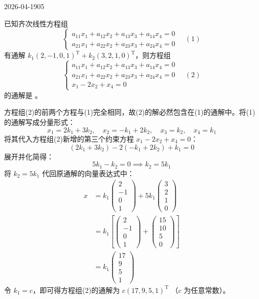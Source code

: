 \begin{mistake}{2026-04-19}{05}

\begin{problemcontent}
已知齐次线性方程组
\[
\begin{cases}
a_{11}x_1 + a_{12}x_2 + a_{13}x_3 + a_{14}x_4 = 0 \\
a_{21}x_1 + a_{22}x_2 + a_{23}x_3 + a_{24}x_4 = 0
\end{cases} \quad (1)
\]
有通解 \( k_1(2, -1, 0, 1)^{\mathrm{T}} + k_2(3, 2, 1, 0)^{\mathrm{T}} \)，则方程组
\[
\begin{cases}
a_{11}x_1 + a_{12}x_2 + a_{13}x_3 + a_{14}x_4 = 0 \\
a_{21}x_1 + a_{22}x_2 + a_{23}x_3 + a_{24}x_4 = 0 \\
x_1 - 2x_2 + x_4 = 0
\end{cases} \quad (2)
\]
的通解是 \underline{\hspace{3cm}}。
\end{problemcontent}

\begin{solutioncontent}
方程组(2)的前两个方程与(1)完全相同，故(2)的解必然包含在(1)的通解中。将(1)的通解写成分量形式：
\[
x_1 = 2k_1 + 3k_2, \quad x_2 = -k_1 + 2k_2, \quad x_3 = k_2, \quad x_4 = k_1
\]
将其代入方程组(2)新增的第三个约束方程 \( x_1 - 2x_2 + x_4 = 0 \)：
\[
(2k_1 + 3k_2) - 2(-k_1 + 2k_2) + k_1 = 0
\]
展开并化简得：
\[
5k_1 - k_2 = 0 \implies k_2 = 5k_1
\]
将 \( k_2 = 5k_1 \) 代回原通解的向量表达式中：
\[
\begin{aligned}
x &= k_1 \begin{pmatrix} 2 \\ -1 \\ 0 \\ 1 \end{pmatrix} + 5k_1 \begin{pmatrix} 3 \\ 2 \\ 1 \\ 0 \end{pmatrix} \\
 &= k_1 \left[ \begin{pmatrix} 2 \\ -1 \\ 0 \\ 1 \end{pmatrix} + \begin{pmatrix} 15 \\ 10 \\ 5 \\ 0 \end{pmatrix} \right] \\
 &= k_1 \begin{pmatrix} 17 \\ 9 \\ 5 \\ 1 \end{pmatrix}
\end{aligned}
\]
令 \( k_1 = c \)，即可得方程组(2)的通解为 \( c(17, 9, 5, 1)^{\mathrm{T}} \) （\( c \) 为任意常数）。
\end{solutioncontent}


\end{mistake}
